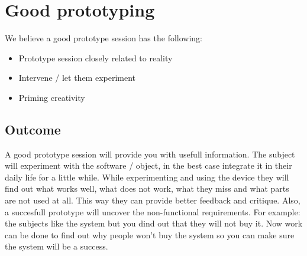 \documentclass{article}
\begin{document}
\section{Good prototyping}
We believe a good prototype session has the following:

\begin{itemize}
\item Prototype session closely related to reality
\item Intervene / let them experiment
\item Priming creativity 
\end{itemize}
 
\subsection{Outcome}
A good prototype session will provide you with usefull information. The subject
will experiment with the software / object, in the best case integrate it in their
daily life for a little while. While experimenting and using the device they will
find out what works well, what does not work, what they miss and what parts
are not used at all. This way they can provide better feedback and critique.
Also, a succesfull prototype will uncover the non-functional requirements.
For example: the subjects like the system but you dind out that they will not
buy it. Now work can be done to find out why people won't buy the system so you can make sure the system will be a success.




\end{document}

